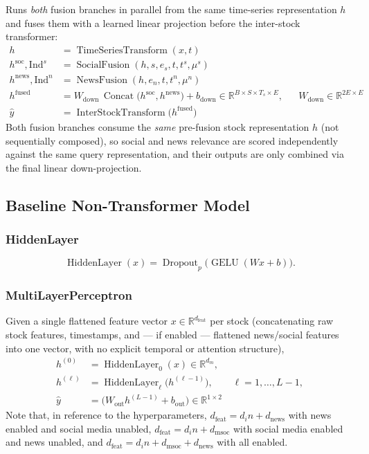 \documentclass[stu,floatsintext]{apa7}
\newcommand{\R}{\mathbb{R}}
\newcommand{\GELU}{\operatorname{GELU}}
\newcommand{\Concat}{\operatorname{Concat}}
\begin{document}
Runs \emph{both} fusion branches in parallel from the same time-series representation $h$ and fuses them
with a learned linear projection before the inter-stock transformer:
\begin{align}
  h &= \operatorname{TimeSeriesTransform}(x,t) \\
  h^{\mathrm{soc}}, \mathrm{Ind}^{s} &= \operatorname{SocialFusion}(h, s, e_s, t, t^{s}, \mu^{s})
  && \text{ }\\
  h^{\mathrm{news}}, \mathrm{Ind}^{n} &= \operatorname{NewsFusion}(h, e_n, t, t^{n}, \mu^{n})
  && \text{ }\\
  h^{\mathrm{fused}} &= W_{\mathrm{down}}\,\Concat\bigl(h^{\mathrm{soc}}, h^{\mathrm{news}}\bigr) + b_{\mathrm{down}}
  \in\R^{B\times S\times T_s\times E}, && W_{\mathrm{down}}\in\R^{2E\times E} \\
  \hat y &= \operatorname{InterStockTransform}\bigl(h^{\mathrm{fused}}\bigr)
\end{align}
Both fusion branches consume the \emph{same} pre-fusion stock representation $h$ (not sequentially
composed), so social and news relevance are scored independently against the same query representation,
and their outputs are only combined via the final linear down-projection.

\subsection{Baseline Non-Transformer Model}

\subsubsection{HiddenLayer}
\begin{equation}
  \operatorname{HiddenLayer}(x) = \operatorname{Dropout}_p\bigl(\GELU(Wx+b)\bigr).
\end{equation}

\subsubsection{MultiLayerPerceptron}

Given a single flattened feature vector $x\in\R^{d_{\mathrm{feat}}}$ per stock (concatenating raw stock
features, timestamps, and — if enabled — flattened news/social features into one vector, with no explicit
temporal or attention structure),
\begin{align}
  h^{(0)} &= \operatorname{HiddenLayer}_0(x) \in\R^{d_m}, \\
  h^{(\ell)} &= \operatorname{HiddenLayer}_\ell\bigl(h^{(\ell-1)}\bigr), \qquad \ell=1,\dots,L-1, \\
  \hat y &= \bigl(W_{\mathrm{out}} h^{(L-1)} + b_{\mathrm{out}}\bigr) \in\R^{1\times 2}
\end{align}
Note that, in reference to the hyperparameters, $d_{\mathrm{feat}}=d_in+d_{\text{news}}$ with news enabled and social media unabled, $d_{\mathrm{feat}}=d_in+d_{\text{msoc}}$ with social media enabled and news unabled, and $d_{\mathrm{feat}}=d_in+d_{\text{msoc}}+d_{\text{news}}$ with all enabled. 
\end{document}
